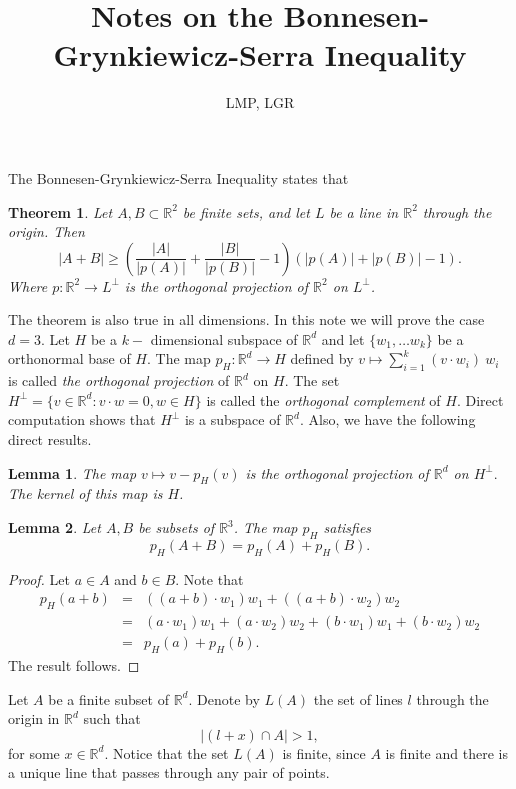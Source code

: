 \documentclass[12pt]{article}
\title{Notes on the Bonnesen-Grynkiewicz-Serra Inequality}
\author{LMP, LGR}
\newcommand{\R}{\mathbb{R}}
\newtheorem{theorem}{Theorem}
\newtheorem{lemma}{Lemma}
\begin{document}
\maketitle

The Bonnesen-Grynkiewicz-Serra Inequality states that %
\begin{theorem} \label{GS}
Let $A, B \subset \R^2$ be finite sets, and let $L$ be a line in $\R^2$ through the origin. Then
$$\lvert A + B \rvert \geq \left( \frac{\lvert A \rvert }{\lvert p (A) \rvert} + \frac{\lvert B \rvert }{\lvert p (B) \rvert } - 1\right) \left( \lvert p(A) \rvert + \lvert p(B) \rvert - 1 \right).$$
Where $p: \R^2 \rightarrow L^\perp$ is the orthogonal projection of $\R^2$ on $L^\perp$.
\end{theorem}

The theorem is also true in all dimensions. In this note we will prove the case $d = 3.$ Let $H$ be a $k-$ dimensional subspace of $\R^d$ and let $\{w_1, \ldots w_k\}$ be a orthonormal base of $H.$ The map $p_H: \R^d \rightarrow H$ defined by $v \mapsto \sum_{i=1}^k (v \cdot w_i) \ w_i$ is called \textit{the orthogonal projection} of $\R^d$ on $H.$ The set $H^\perp = \{v \in \R^d: v \cdot w = 0, w \in H \}$ is called the \textit{orthogonal complement} of $H$. Direct computation shows that $H^\perp$ is a subspace of $\R^d$. Also, we have the following direct results. %

\begin{lemma}
    The map $v \mapsto v - p_H (v)$ is the orthogonal projection of $\R^d$ on $H^\perp.$ The kernel of this map is $H$.
\end{lemma}

\begin{lemma}
    Let $A, B$ be subsets of $\R^3$. The map $p_H$ satisfies 
    $$p_H(A + B) = p_H(A) + p_H(B).$$
\end{lemma}
\begin{proof} Let $a \in A$ and $b\in B.$ Note that 
\begin{eqnarray*}
p_H(a + b) &=&  ((a + b)\cdot w_1) w_1 + ((a+b) \cdot w_2) w_2\\
&=& (a\cdot w_1) w_1 + (a \cdot w_2) w_2 +(b\cdot w_1) w_1 + (b \cdot w_2) w_2\\
&=& p_H(a) + p_H(b).
\end{eqnarray*}
The result follows.
\end{proof}

Let $A$ be a finite subset of $\R^d$. Denote by $L(A)$ the set of lines $l$ through the origin in $\R^d$ such that
$$\lvert (l + x) \cap A \rvert > 1,$$
for some $x \in \R^d$. Notice that the set $L(A)$ is finite, since $A$ is finite and there is a unique line that passes through any pair of points.
\end{document}

